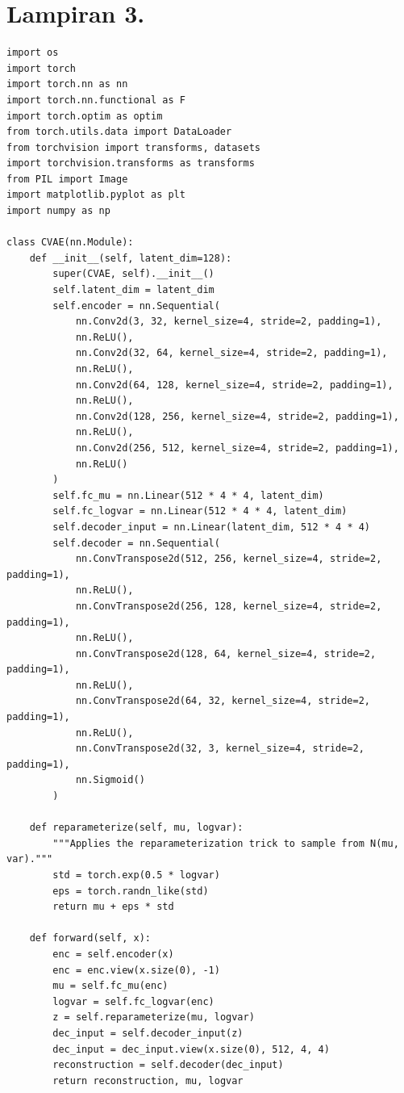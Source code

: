 \section*{Lampiran 3. }
\label{Lampiran 3}
\begin{verbatim}
import os
import torch
import torch.nn as nn
import torch.nn.functional as F
import torch.optim as optim
from torch.utils.data import DataLoader
from torchvision import transforms, datasets
import torchvision.transforms as transforms
from PIL import Image
import matplotlib.pyplot as plt
import numpy as np

class CVAE(nn.Module):
    def __init__(self, latent_dim=128):
        super(CVAE, self).__init__()
        self.latent_dim = latent_dim
        self.encoder = nn.Sequential(
            nn.Conv2d(3, 32, kernel_size=4, stride=2, padding=1),
            nn.ReLU(),
            nn.Conv2d(32, 64, kernel_size=4, stride=2, padding=1),
            nn.ReLU(),
            nn.Conv2d(64, 128, kernel_size=4, stride=2, padding=1),
            nn.ReLU(),
            nn.Conv2d(128, 256, kernel_size=4, stride=2, padding=1),
            nn.ReLU(),
            nn.Conv2d(256, 512, kernel_size=4, stride=2, padding=1),
            nn.ReLU()
        )
        self.fc_mu = nn.Linear(512 * 4 * 4, latent_dim)
        self.fc_logvar = nn.Linear(512 * 4 * 4, latent_dim)
        self.decoder_input = nn.Linear(latent_dim, 512 * 4 * 4)
        self.decoder = nn.Sequential(
            nn.ConvTranspose2d(512, 256, kernel_size=4, stride=2, padding=1),
            nn.ReLU(),
            nn.ConvTranspose2d(256, 128, kernel_size=4, stride=2, padding=1),
            nn.ReLU(),
            nn.ConvTranspose2d(128, 64, kernel_size=4, stride=2, padding=1),
            nn.ReLU(),
            nn.ConvTranspose2d(64, 32, kernel_size=4, stride=2, padding=1),
            nn.ReLU(),
            nn.ConvTranspose2d(32, 3, kernel_size=4, stride=2, padding=1),
            nn.Sigmoid()
        )

    def reparameterize(self, mu, logvar):
        """Applies the reparameterization trick to sample from N(mu, var)."""
        std = torch.exp(0.5 * logvar)
        eps = torch.randn_like(std)
        return mu + eps * std

    def forward(self, x):
        enc = self.encoder(x)
        enc = enc.view(x.size(0), -1)
        mu = self.fc_mu(enc)
        logvar = self.fc_logvar(enc)
        z = self.reparameterize(mu, logvar)
        dec_input = self.decoder_input(z)
        dec_input = dec_input.view(x.size(0), 512, 4, 4)
        reconstruction = self.decoder(dec_input)
        return reconstruction, mu, logvar


\end{verbatim}
